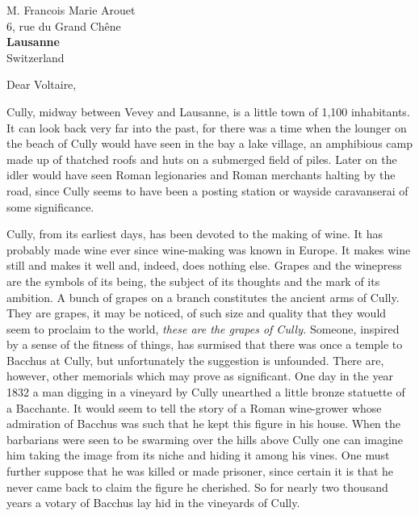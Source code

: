 \documentclass[11pt,french,bruni]{hletter}
\begin{document}

\signature{Sir Frederick Treves\\Sergeant-Surgeon to His Majesty the King}


\date{Lausanne, le 15 septembre 1922}

\begin{letter}{M. Francois Marie Arouet \\
               6, rue du Grand Ch\^{e}ne \\
               \textbf{Lausanne} \\
               Switzerland}

\opening[{[COPY]}]{Dear Voltaire,}

Cully, midway between Vevey and Lausanne, is a little town of 1,100
inhabitants. It can look back very far into the past, for there was a time
when the lounger on the beach of Cully would have seen in the bay a lake
village, an amphibious camp made up of thatched roofs and huts on a submerged
field of piles. Later on the idler would have seen Roman legionaries and
Roman merchants halting by the road, since Cully seems to have been a posting
station or wayside caravanserai of some significance.

Cully, from its earliest days, has been devoted to the making of wine.
It has probably made wine ever since wine-making was known in Europe.
It makes wine still and makes it well and, indeed, does nothing else.
Grapes and the winepress are the symbols of its being, the subject of
its thoughts and the mark of its ambition. A bunch of grapes on a
branch constitutes the ancient arms of Cully. They are grapes, it may
be noticed, of such size and quality that they would seem to proclaim
to the world, \emph{these are the grapes of Cully.}  Someone, inspired
by a sense of the fitness of things, has surmised that there was once a
temple to Bacchus at Cully, but unfortunately the suggestion is
unfounded. There are, however, other memorials which may prove as
significant. One day in the year 1832 a man digging in a vineyard by
Cully unearthed a little bronze statuette of a Bacchante. It would seem
to tell the story of a Roman wine-grower whose admiration of Bacchus
was such that he kept this figure in his house. When the barbarians
were seen to be swarming over the hills above Cully one can imagine him
taking the image from its niche and hiding it among his vines. One must
further suppose that he was killed or made prisoner, since certain it
is that he never came back to claim the figure he cherished. So for
nearly two thousand years a votary of Bacchus lay hid in the vineyards
of Cully.


\end{letter}
\end{document}
